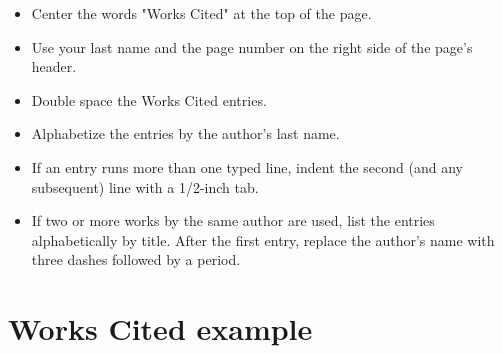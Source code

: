 \begin{itemize}
\item Center the words "Works Cited" at the top of the page.
\item Use your last name and the page number on the right side of the page's header.
\item Double space the Works Cited entries.
\item Alphabetize the entries by the author's last name.
\item If an entry runs more than one typed line, indent the second (and any subsequent) line with a 1/2-inch tab.
\item If two or more works by the same author are used, list the entries alphabetically by title. After the first entry, replace the author's name with three dashes followed by a period.
\end{itemize}
\newpage

\section{Works Cited example}

\bigskip

